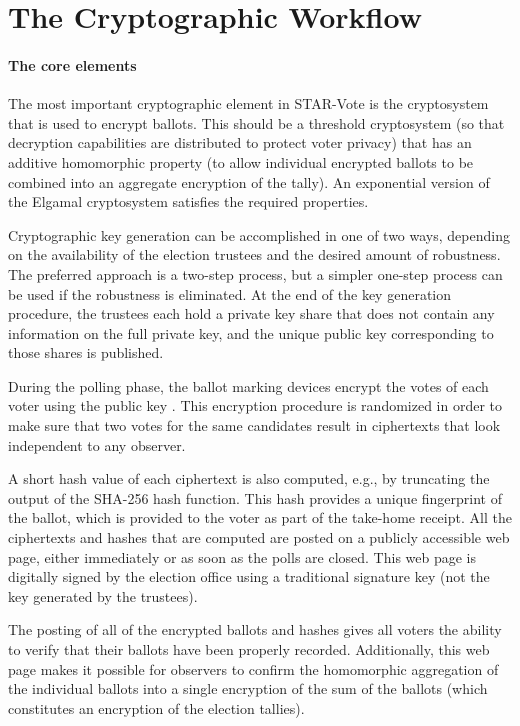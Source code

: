 \documentclass[letterpaper, 10pt, twocolumn]{article}
\newcommand{\elgamal}{Elgamal\xspace}
\begin{document}
\section{The Cryptographic Workflow}

\label{sec:crypto}




\paragraph{The core elements}
\label{sec:crypto-core}



The most important cryptographic element in STAR-Vote is the cryptosystem
that is used to encrypt ballots.  This should be a threshold cryptosystem
(so that decryption capabilities are distributed to protect voter privacy)
that has an additive homomorphic property (to allow individual encrypted ballots to
be combined into an aggregate encryption of the tally).  An exponential
version of the \elgamal cryptosystem satisfies the required properties.

Cryptographic key generation can be accomplished in one of two ways, depending on the availability of the election trustees and the desired
amount of robustness.  The preferred approach is a two-step process,
but a simpler one-step process can be used if the robustness is eliminated.
At the end of the key generation procedure, the trustees each hold a
private key share that does not contain any information on the full
private key, and the unique public key  corresponding to those
shares is published.

During the polling phase, the ballot marking devices encrypt the votes
of each voter using the public key . This encryption procedure is
randomized in order to make sure that two votes for the same
candidates result in ciphertexts that look independent to any
observer. 

A short hash value of each ciphertext is also computed, e.g., by
truncating the output of the SHA-256 hash function.  This hash provides
a unique fingerprint of the ballot, which is provided to the voter as
part of the take-home receipt. All the ciphertexts and hashes that are
computed are posted on a publicly accessible web page, either
immediately or as soon as the polls are closed. This web page is
digitally signed by the election office using a traditional signature
key (not the key generated by the trustees).

The posting of all of the encrypted ballots and hashes gives all voters
the ability to verify that their ballots have been properly recorded.
Additionally, this web page makes it possible for observers
to confirm the homomorphic aggregation of the individual ballots into a
single encryption of the sum of the ballots (which constitutes an encryption
of the election tallies). 
\end{document}
